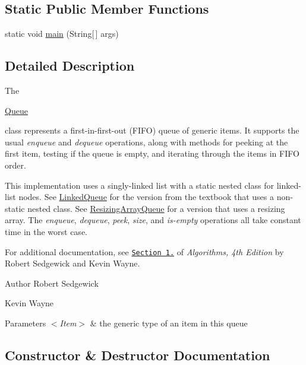 \subsection*{Static Public Member Functions}
\begin{DoxyCompactItemize}
\item 
static void \hyperlink{classcom_1_1mycompany_1_1myfirstmapboxapp_1_1_queue_a44b7f4882c64014a729d336896339094}{main} (String\mbox{[}$\,$\mbox{]} args)
\end{DoxyCompactItemize}


\subsection{Detailed Description}
The
\begin{DoxyCode}
\hyperlink{classcom_1_1mycompany_1_1myfirstmapboxapp_1_1_queue_a5dd70f04adf8da1736bb5eb94ad0d95b}{Queue} 
\end{DoxyCode}
 class represents a first-\/in-\/first-\/out (F\+I\+FO) queue of generic items. It supports the usual {\itshape enqueue} and {\itshape dequeue} operations, along with methods for peeking at the first item, testing if the queue is empty, and iterating through the items in F\+I\+FO order. 

This implementation uses a singly-\/linked list with a static nested class for linked-\/list nodes. See \hyperlink{}{Linked\+Queue} for the version from the textbook that uses a non-\/static nested class. See \hyperlink{}{Resizing\+Array\+Queue} for a version that uses a resizing array. The {\itshape enqueue}, {\itshape dequeue}, {\itshape peek}, {\itshape size}, and {\itshape is-\/empty} operations all take constant time in the worst case. 

For additional documentation, see \href{http://algs4.cs.princeton.edu/13stacks}{\tt Section 1.} of {\itshape Algorithms, 4th Edition} by Robert Sedgewick and Kevin Wayne.

\begin{DoxyAuthor}{Author}
Robert Sedgewick 

Kevin Wayne
\end{DoxyAuthor}

\begin{DoxyParams}{Parameters}
{\em $<$\+Item$>$} & the generic type of an item in this queue \\
\hline
\end{DoxyParams}


\subsection{Constructor \& Destructor Documentation}
\mbox{\label{classcom_1_1mycompany_1_1myfirstmapboxapp_1_1_queue_a5dd70f04adf8da1736bb5eb94ad0d95b}} 
